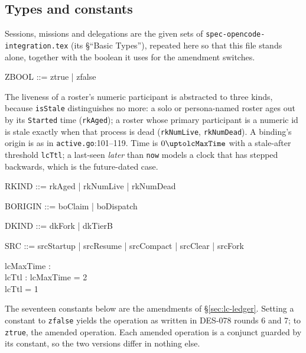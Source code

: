 \documentclass[a4paper,10pt,fleqn]{article}
\newcommand{\fpath}[1]{\texttt{#1}}
\newcommand{\field}[1]{\texttt{#1}}
\begin{document}
\subsection{Types and constants}

Sessions, missions and delegations are the given sets of
\texttt{spec-opencode-integration.tex} (its \S``Basic Types''), repeated
here so that this file stands alone, together with the boolean it uses for
the amendment switches.

\begin{zed}
\end{zed}

\begin{zed}
ZBOOL ::= ztrue | zfalse
\end{zed}

The liveness of a roster's numeric participant is
abstracted to three kinds, because \field{isStale} distinguishes no more:
a solo or persona-named roster ages out by its \field{Started} time
(\field{rkAged}); a roster whose primary participant is a numeric id is
stale exactly when that process is dead (\field{rkNumLive},
\field{rkNumDead}). A binding's origin is as in \fpath{active.go}:101--119.
Time is $0 \upto \field{lcMaxTime}$ with a stale-after threshold
\field{lcTtl}; a last-seen \emph{later} than \field{now} models a clock that
has stepped backwards, which is the future-dated case.

\begin{zed}
RKIND ::= rkAged | rkNumLive | rkNumDead
\end{zed}

\begin{zed}
BORIGIN ::= boClaim | boDispatch
\end{zed}

\begin{zed}
DKIND ::= dkFork | dkTierB
\end{zed}

\begin{zed}
SRC ::= srcStartup | srcResume | srcCompact | srcClear | srcFork
\end{zed}

\begin{axdef}
lcMaxTime : \nat \\
lcTtl : \nat
\where
lcMaxTime = 2 \\
lcTtl = 1
\end{axdef}

The seventeen constants below are the amendments of \S\ref{sec:lc-ledger}.
Setting a constant to \field{zfalse} yields the operation as written in
DES-078 rounds 6 and 7; to \field{ztrue}, the amended operation. Each
amended operation is a conjunct guarded by its constant, so the two
versions differ in nothing else.
\end{document}
